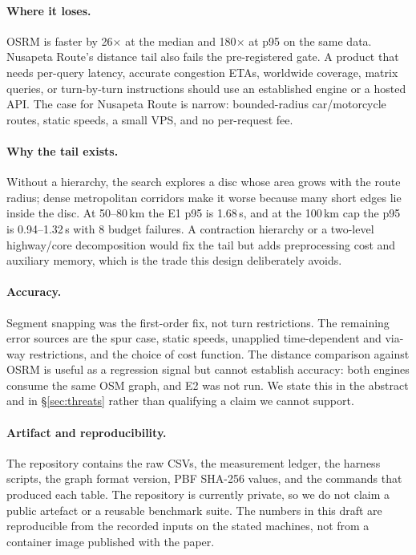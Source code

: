 \documentclass[sigconf,nonacm]{acmart}
\begin{document}
\paragraph{Where it loses.}
OSRM is faster by 26$\times$ at the median and 180$\times$ at p95 on the same
data. Nusapeta Route's distance tail also fails the pre-registered gate. A product that
needs per-query latency, accurate congestion ETAs, worldwide coverage, matrix
queries, or turn-by-turn instructions should use an established engine or a
hosted API. The case for Nusapeta Route is narrow: bounded-radius car/motorcycle routes,
static speeds, a small VPS, and no per-request fee.

\paragraph{Why the tail exists.}
Without a hierarchy, the search explores a disc whose area grows with the route
radius; dense metropolitan corridors make it worse because many short edges lie
inside the disc. At 50--80\,km the E1 p95 is 1.68\,s, and at the 100\,km cap the
p95 is 0.94--1.32\,s with 8 budget failures. A contraction hierarchy or a
two-level highway/core decomposition would fix the tail but adds preprocessing
cost and auxiliary memory, which is the trade this design deliberately avoids.

\paragraph{Accuracy.}
Segment snapping was the first-order fix, not turn restrictions. The remaining
error sources are the spur case, static speeds, unapplied time-dependent and
via-way restrictions, and the choice of cost function. The distance comparison
against OSRM is useful as a regression signal but cannot establish accuracy: both
engines consume the same OSM graph, and E2 was not run. We state this in the
abstract and in \S\ref{sec:threats} rather than qualifying a claim we cannot
support.

\paragraph{Artifact and reproducibility.}
The repository contains the raw CSVs, the measurement ledger, the harness
scripts, the graph format version, PBF SHA-256 values, and the commands that
produced each table. The repository is currently private, so we do not claim a
public artefact or a reusable benchmark suite. The numbers in this draft are
reproducible from the recorded inputs on the stated machines, not from a container
image published with the paper.
\end{document}
